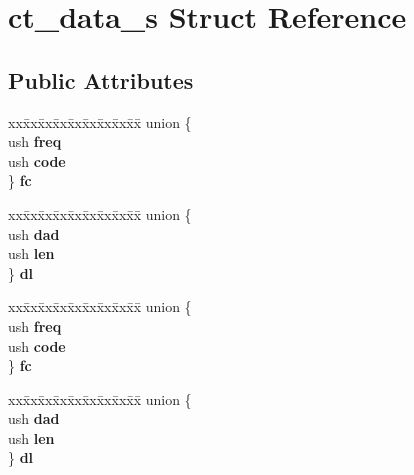 \hypertarget{structct__data__s}{}\section{ct\+\_\+data\+\_\+s Struct Reference}
\label{structct__data__s}
\subsection*{Public Attributes}
\begin{DoxyCompactItemize}
\item 
\mbox{\label{structct__data__s_ad0ed0a631ed5632d6936f3004e5becfb}} 
\begin{tabbing}
xx\=xx\=xx\=xx\=xx\=xx\=xx\=xx\=xx\=\kill
union \{\\
\>ush {\bfseries freq}\\
\>ush {\bfseries code}\\
\} {\bfseries fc}\\

\end{tabbing}\item 
\mbox{\label{structct__data__s_a82e0c9b7c512293c0556b404d6eabb95}} 
\begin{tabbing}
xx\=xx\=xx\=xx\=xx\=xx\=xx\=xx\=xx\=\kill
union \{\\
\>ush {\bfseries dad}\\
\>ush {\bfseries len}\\
\} {\bfseries dl}\\

\end{tabbing}\item 
\mbox{\label{structct__data__s_af3c0f7f630f3c132f300243ad2f1a5b0}} 
\begin{tabbing}
xx\=xx\=xx\=xx\=xx\=xx\=xx\=xx\=xx\=\kill
union \{\\
\>ush {\bfseries freq}\\
\>ush {\bfseries code}\\
\} {\bfseries fc}\\

\end{tabbing}\item 
\mbox{\label{structct__data__s_a1660e36baabec16653bae2f2d2107ef9}} 
\begin{tabbing}
xx\=xx\=xx\=xx\=xx\=xx\=xx\=xx\=xx\=\kill
union \{\\
\>ush {\bfseries dad}\\
\>ush {\bfseries len}\\
\} {\bfseries dl}\\

\end{tabbing}\end{DoxyCompactItemize}


